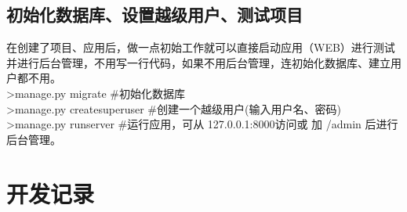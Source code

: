 \documentclass[a4paper]{ctexart}
\begin{document}
    \subsection{初始化数据库、设置越级用户、测试项目}
    在创建了项目、应用后，做一点初始工作就可以直接启动应用（WEB）进行测试并进行后台管理，不用写一行代码，如果不用后台管理，连初始化数据库、建立用户都不用。\\
      \indent >manage.py migrate  \#初始化数据库 \\
      \indent >manage.py createsuperuser \#创建一个越级用户(输入用户名、密码)\\
      \indent >manage.py runserver \#运行应用，可从 127.0.0.1:8000访问或 加 /admin 后进行后台管理。
  \newpage
  \section{开发记录}
    \subsection{}
          
  
    
  
\end{document}
